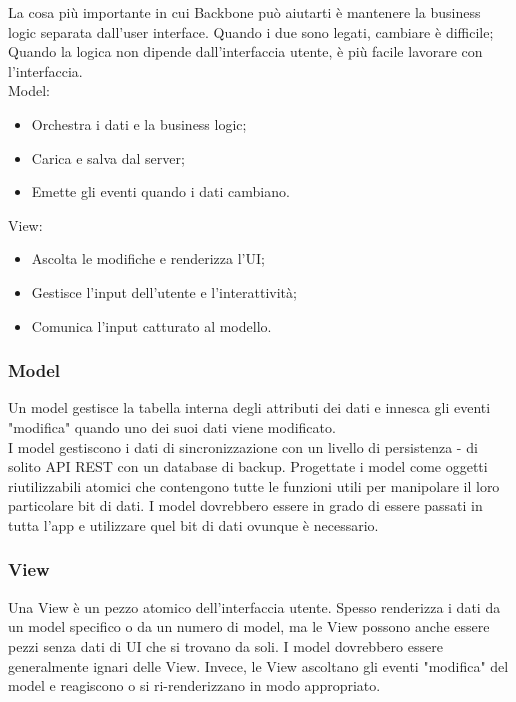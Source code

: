 \documentclass[../SpecificaTecnica.tex]{subfiles}
\begin{document}
La cosa più importante in cui Backbone può aiutarti è mantenere la business logic separata dall'user interface. Quando i due sono legati, cambiare è difficile; Quando la logica non dipende dall'interfaccia utente, è più facile lavorare con l'interfaccia.
\\
Model:
\begin{itemize}
\item Orchestra i dati e la business logic;
\item Carica e salva dal server;
\item Emette gli eventi quando i dati cambiano.
\end{itemize}
View:
\begin{itemize}
\item Ascolta le modifiche e renderizza l'UI;
\item Gestisce l'input dell'utente e l'interattività;
\item Comunica l'input catturato al modello.
\end{itemize}

\subsubsection{Model }
Un model gestisce la tabella interna degli attributi dei dati e innesca gli eventi "modifica" quando uno dei suoi dati viene modificato.\\
I model gestiscono i dati di sincronizzazione con un livello di persistenza - di solito API REST con un database di backup. Progettate i model come oggetti riutilizzabili atomici che contengono tutte le funzioni utili per manipolare il loro particolare bit di dati. I model dovrebbero essere in grado di essere passati in tutta l'app e utilizzare quel bit di dati ovunque è necessario.\\

\subsubsection{ View}
Una View è un pezzo atomico dell'interfaccia utente. Spesso renderizza i dati da un model specifico o da un numero di model, ma le View possono anche essere pezzi senza dati di UI che si trovano da soli. I model dovrebbero essere generalmente ignari delle View. Invece, le View ascoltano gli eventi "modifica" del model e reagiscono o si ri-renderizzano in modo appropriato.
\end{document}
